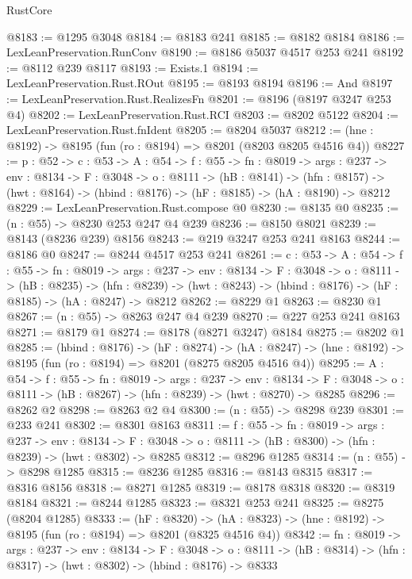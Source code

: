 \begin{lexlean}{RustCore}
\begin{coremodule}
@8183 := @1295 @3048
@8184 := @8183 @241
@8185 := @8182 @8184
@8186 := LexLeanPreservation.RunConv
@8190 := @8186 @5037 @4517 @253 @241
@8192 := @8112 @239 @8117
@8193 := Exists.{1}
@8194 := LexLeanPreservation.Rust.ROut
@8195 := @8193 @8194
@8196 := And
@8197 := LexLeanPreservation.Rust.RealizesFn
@8201 := @8196 (@8197 @3247 @253 @4)
@8202 := LexLeanPreservation.Rust.RCI
@8203 := @8202 @5122
@8204 := LexLeanPreservation.Rust.fnIdent
@8205 := @8204 @5037
@8212 := (hne : @8192) -> @8195 (fun (ro : @8194) => @8201 (@8203 @8205 @4516 @4))
@8227 := {p : @52} ->
  {c : @53} ->
  {A : @54} ->
  {f : @55} ->
  {fn : @8019} ->
  {args : @237} ->
  {env : @8134} ->
  {F : @3048} ->
  {o : @8111} ->
  (hB : @8141) ->
  (hfn : @8157) -> (hwt : @8164) -> (hbind : @8176) -> (hF : @8185) -> (hA : @8190) -> @8212
@8229 := LexLeanPreservation.Rust.compose @0
@8230 := @8135 @0
@8235 := (n : @55) -> @8230 @253 @247 @4 @239
@8236 := @8150 @8021
@8239 := @8143 (@8236 @239) @8156
@8243 := @219 @3247 @253 @241 @8163
@8244 := @8186 @0
@8247 := @8244 @4517 @253 @241
@8261 := {c : @53} ->
  {A : @54} ->
  {f : @55} ->
  {fn : @8019} ->
  {args : @237} ->
  {env : @8134} ->
  {F : @3048} ->
  {o : @8111} ->
  (hB : @8235) ->
  (hfn : @8239) -> (hwt : @8243) -> (hbind : @8176) -> (hF : @8185) -> (hA : @8247) -> @8212
@8262 := @8229 @1
@8263 := @8230 @1
@8267 := (n : @55) -> @8263 @247 @4 @239
@8270 := @227 @253 @241 @8163
@8271 := @8179 @1
@8274 := @8178 (@8271 @3247) @8184
@8275 := @8202 @1
@8285 := (hbind : @8176) ->
  (hF : @8274) ->
  (hA : @8247) -> (hne : @8192) -> @8195 (fun (ro : @8194) => @8201 (@8275 @8205 @4516 @4))
@8295 := {A : @54} ->
  {f : @55} ->
  {fn : @8019} ->
  {args : @237} ->
  {env : @8134} ->
  {F : @3048} -> {o : @8111} -> (hB : @8267) -> (hfn : @8239) -> (hwt : @8270) -> @8285
@8296 := @8262 @2
@8298 := @8263 @2 @4
@8300 := (n : @55) -> @8298 @239
@8301 := @233 @241
@8302 := @8301 @8163
@8311 := {f : @55} ->
  {fn : @8019} ->
  {args : @237} ->
  {env : @8134} ->
  {F : @3048} -> {o : @8111} -> (hB : @8300) -> (hfn : @8239) -> (hwt : @8302) -> @8285
@8312 := @8296 @1285
@8314 := (n : @55) -> @8298 @1285
@8315 := @8236 @1285
@8316 := @8143 @8315
@8317 := @8316 @8156
@8318 := @8271 @1285
@8319 := @8178 @8318
@8320 := @8319 @8184
@8321 := @8244 @1285
@8323 := @8321 @253 @241
@8325 := @8275 (@8204 @1285)
@8333 := (hF : @8320) ->
  (hA : @8323) -> (hne : @8192) -> @8195 (fun (ro : @8194) => @8201 (@8325 @4516 @4))
@8342 := {fn : @8019} ->
  {args : @237} ->
  {env : @8134} ->
  {F : @3048} ->
  {o : @8111} -> (hB : @8314) -> (hfn : @8317) -> (hwt : @8302) -> (hbind : @8176) -> @8333

\end{coremodule}
\end{lexlean}
